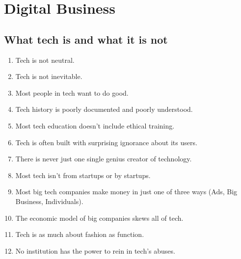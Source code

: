 \section{Digital Business}
\subsection{What tech is and what it is not}
\begin{enumerate}
	\item Tech is not neutral.
	\item Tech is not inevitable.
	\item Most people in tech want to do good.
	\item Tech history is poorly documented and poorly understood.
	\item Most tech education doesn’t include ethical training.
	\item Tech is often built with surprising ignorance about its users.
	\item There is never just one single genius creator of technology.
	\item Most tech isn’t from startups or by startups.
	\item Most big tech companies make money in just one of three ways (Ads, Big Business, Individuals).
	\item The economic model of big companies skews all of tech.
	\item Tech is as much about fashion as function.
	\item No institution has the power to rein in tech’s abuses.
\end{enumerate}

